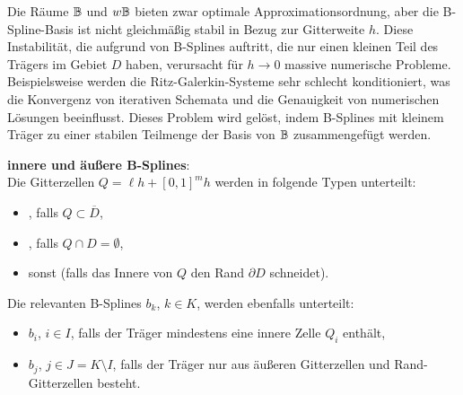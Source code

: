 Die Räume $\mathbb{B}$ und $w\mathbb{B}$ bieten zwar optimale Approximationsordnung,
aber die B-Spline-Basis ist nicht gleichmäßig stabil in Bezug zur Gitterweite $h$.
Diese Instabilität, die aufgrund von B-Splines auftritt, die nur einen kleinen Teil des Trägers
im Gebiet $D$ haben, verursacht für $h \to 0$ massive numerische Probleme.
Beispielsweise werden die Ritz-Galerkin-Systeme sehr schlecht konditioniert,
was die Konvergenz von iterativen Schemata und die Genauigkeit von numerischen Lösungen
beeinflusst.
Dieses Problem wird gelöst, indem B-Splines mit kleinem Träger zu einer stabilen Teilmenge der
Basis von $\mathbb{B}$ zusammengefügt werden.

\textbf{innere und äußere B-Splines}:\\
Die Gitterzellen $Q = \ell h + [0, 1]^m h$ werden in folgende Typen unterteilt:
\begin{itemize}
    \item
    , falls $Q \subset \overline{D}$,
    
    \item
    , falls $Q \cap D = \emptyset$,
    
    \item
     sonst
    (falls das Innere von $Q$ den Rand $\partial D$ schneidet).
\end{itemize}
Die relevanten B-Splines $b_k$, $k \in K$, werden ebenfalls unterteilt:
\begin{itemize}
    \item
     $b_i$, $i \in I$,
    falls der Träger mindestens eine innere Zelle $Q_i$ enthält,
    
    \item
     $b_j$, $j \in J = K \setminus I$,
    falls der Träger nur aus äußeren Gitterzellen und Rand-Gitterzellen besteht.
\end{itemize}

\linie

